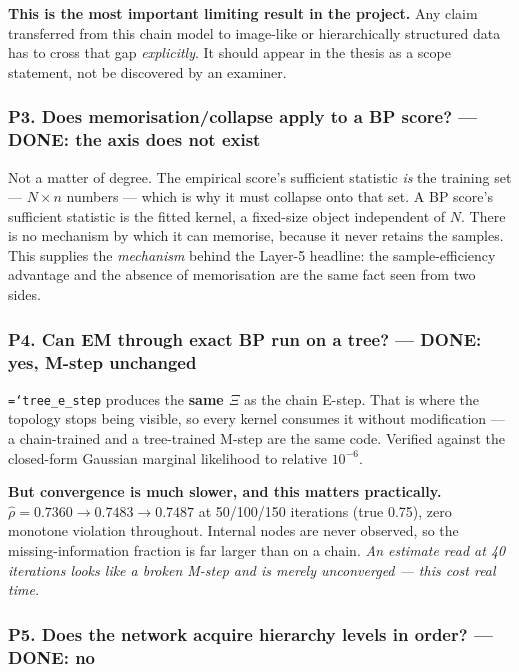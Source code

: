 \documentclass[11pt,a4paper]{article}
\newcommand{\done}{\textcolor{GoodGreen}{\textbf{DONE}}}
\newcommand{\code}[1]{\texttt{\small\hyphenchar\font=`\-\relax #1}}
\begin{document}
\begin{keybox}
\textbf{This is the most important limiting result in the project.} Any claim transferred
from this chain model to image-like or hierarchically structured data has to cross that gap
\emph{explicitly}. It should appear in the thesis as a scope statement, not be discovered by
an examiner.
\end{keybox}

\subsubsection*{P3. Does memorisation/collapse apply to a BP score? --- \done: the axis does not exist}

Not a matter of degree. The empirical score's sufficient statistic \emph{is} the training set
--- $N\times n$ numbers --- which is why it must collapse onto that set. A BP score's
sufficient statistic is the fitted kernel, a fixed-size object independent of $N$. There is
no mechanism by which it can memorise, because it never retains the samples. This supplies
the \emph{mechanism} behind the Layer-5 headline: the sample-efficiency advantage and the
absence of memorisation are the same fact seen from two sides.

\subsubsection*{P4. Can EM through exact BP run on a tree? --- \done: yes, M-step unchanged}

\code{tree\_e\_step} produces the \textbf{same $\Xi$} as the chain E-step. That is where the
topology stops being visible, so every kernel consumes it without modification --- a
chain-trained and a tree-trained M-step are the same code. Verified against the closed-form
Gaussian marginal likelihood to relative $10^{-6}$.

\textbf{But convergence is much slower, and this matters practically.}
$\hat\rho = 0.7360 \to 0.7483 \to 0.7487$ at 50/100/150 iterations (true 0.75), zero
monotone violation throughout. Internal nodes are never observed, so the missing-information
fraction is far larger than on a chain. \emph{An estimate read at 40 iterations looks like a
broken M-step and is merely unconverged --- this cost real time.}

\subsubsection*{P5. Does the network acquire hierarchy levels in order? --- \done: no}
\end{document}

